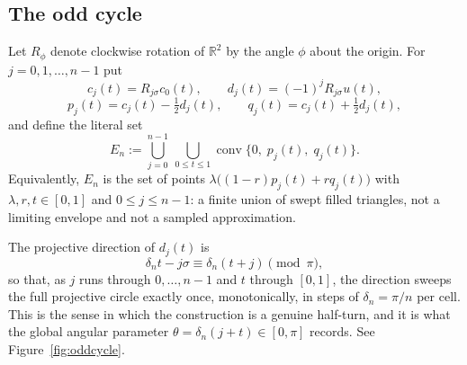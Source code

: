 \documentclass[11pt]{article}
\theoremstyle{plain}
\theoremstyle{definition}
\theoremstyle{remark}
\newcommand{\R}{\mathbb{R}}
\newcommand{\conv}{\operatorname{conv}}
\begin{document}
\subsection{The odd cycle}

Let $R_{\phi}$ denote clockwise rotation of $\R^{2}$ by the angle $\phi$ about
the origin. For $j=0,1,\dots,n-1$ put
\begin{equation}\label{eq:cells}
  c_{j}(t)=R_{j\sigma}c_{0}(t),\qquad
  d_{j}(t)=(-1)^{j}R_{j\sigma}u(t),
\end{equation}
\[
  p_{j}(t)=c_{j}(t)-\tfrac12 d_{j}(t),\qquad
  q_{j}(t)=c_{j}(t)+\tfrac12 d_{j}(t),
\]
and define the literal set
\begin{equation}\label{eq:Edef}
  E_{n}
  :=\bigcup_{j=0}^{n-1}\ \bigcup_{0\le t\le 1}
    \conv\bigl\{0,\;p_{j}(t),\;q_{j}(t)\bigr\}.
\end{equation}
Equivalently, $E_{n}$ is the set of points
$\lambda\bigl((1-r)p_{j}(t)+rq_{j}(t)\bigr)$ with
$\lambda,r,t\in[0,1]$ and $0\le j\le n-1$: a finite union of swept filled
triangles, not a limiting envelope and not a sampled approximation.

The projective direction of $d_{j}(t)$ is
\[
  \delta_{n} t-j\sigma\equiv \delta_{n}(t+j)\pmod{\pi},
\]
so that, as $j$ runs through $0,\dots,n-1$ and $t$ through $[0,1]$, the
direction sweeps the full projective circle exactly once, monotonically, in
steps of $\delta_{n}=\pi/n$ per cell. This is the sense in which the construction is
a genuine half-turn, and it is what the global angular parameter
$\theta=\delta_{n}(j+t)\in[0,\pi]$ records. See Figure~\ref{fig:oddcycle}.
\end{document}
